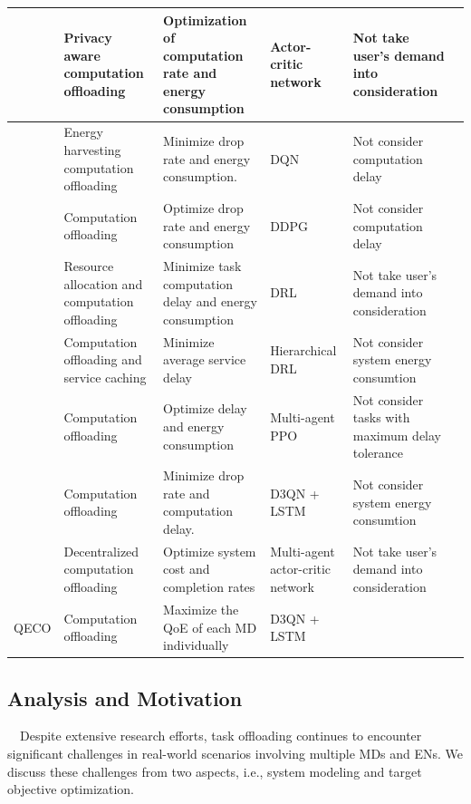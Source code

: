 \documentclass[12pt,draftclsnofoot,onecolumn]{IEEEtran}
\newenvironment{my}[2]%
{\begin{list}{}%
{\setlength{\rightmargin}{#1}\setlength{\leftmargin}{#2}}%


 \item[]{}

} {\end{list}}
\begin{document}
\begin{enumerate}
\begin{my}{1cm}{1cm}
{\begin{table}[tbp]
{{\begin{tabular}{ lp{7cm}p{6cm}p{4cm}p{6cm}l}
						\cite{wu2024combining}   & Privacy aware computation offloading & Optimization of computation rate and energy consumption  & Actor-critic network  & Not take user's demand into consideration \\\midrule
						\cite{Bolourian-WCL24}  & Energy harvesting  computation offloading & Minimize drop rate and energy consumption.  & DQN & Not consider computation delay  \\\midrule
						\cite{huang2021deadline}  & Computation offloading & Optimize drop rate and energy consumption & DDPG & Not consider computation delay \\ \midrule
						\cite{gong2022edge} & Resource allocation and computation offloading & Minimize task computation delay and energy consumption  & DRL & Not take user's demand into consideration\\\midrule
						\cite{sun2024hierarchical} & Computation offloading and service caching & Minimize average service delay & Hierarchical DRL & Not consider system energy consumtion \\\midrule
						\cite{wu2023multi}  & Computation offloading & Optimize delay and energy consumption  & Multi-agent PPO&  Not consider tasks with maximum delay tolerance \\\midrule
						\cite{9253665}  &  Computation offloading & Minimize drop rate and computation delay.  & D3QN + LSTM & Not consider system energy consumtion\\\midrule
						\cite{gao2022large}  & Decentralized computation offloading & Optimize system cost and completion rates  & Multi-agent actor-critic network& Not take user's demand into consideration \\\midrule
						QECO  &  Computation offloading & Maximize the QoE of each MD individually & D3QN + LSTM & \\
						\toprule
				\end{tabular}}
				\label{table11}}
		\end{table}
		\subsection{Analysis and Motivation}
		\,\,\,\,
		Despite extensive research efforts, task offloading continues to encounter significant challenges in real-world scenarios involving multiple MDs and ENs. We discuss these challenges from two aspects, i.e., system modeling and target objective optimization. \vspace{3mm}
		
}
\end{my}
\end{enumerate}
\end{document}

